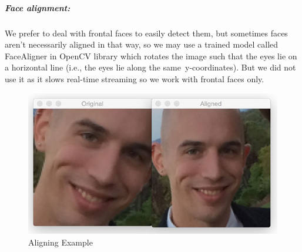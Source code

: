 \subparagraph{Face alignment:}
We prefer to deal with frontal faces to easily detect them, but sometimes faces aren’t necessarily aligned in that way, so we may use a trained model called FaceAligner in OpenCV library which rotates the image such that the eyes lie on a horizontal line (i.e., the eyes lie along the same y-coordinates).\newline
But we did not use it as it slows real-time streaming so we work with frontal faces only.
\begin{figure}[H]
	\centering
	\includegraphics[width=\linewidth]{images/Aligning.jpg}
	\caption{Aligning Example}
\end{figure}
